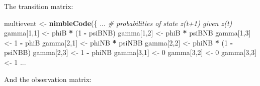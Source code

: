 \documentclass[
  12pt,
]{krantz}
\newenvironment{Shaded}{\begin{snugshade}}{\end{snugshade}}
\newcommand{\CommentTok}[1]{\textcolor[rgb]{0.56,0.35,0.01}{\textit{#1}}}
\newcommand{\DecValTok}[1]{\textcolor[rgb]{0.00,0.00,0.81}{#1}}
\newcommand{\FunctionTok}[1]{\textcolor[rgb]{0.13,0.29,0.53}{\textbf{#1}}}
\newcommand{\NormalTok}[1]{#1}
\newcommand{\OtherTok}[1]{\textcolor[rgb]{0.56,0.35,0.01}{#1}}
\newcommand{\SpecialCharTok}[1]{\textcolor[rgb]{0.81,0.36,0.00}{\textbf{#1}}}
\begin{document}
The transition matrix:

\begin{Shaded}
\begin{Highlighting}[]
\NormalTok{multievent }\OtherTok{\textless{}{-}} \FunctionTok{nimbleCode}\NormalTok{(\{}
\NormalTok{...}
  \CommentTok{\# probabilities of state z(t+1) given z(t)}
\NormalTok{  gamma[}\DecValTok{1}\NormalTok{,}\DecValTok{1}\NormalTok{] }\OtherTok{\textless{}{-}}\NormalTok{ phiB }\SpecialCharTok{*}\NormalTok{ (}\DecValTok{1} \SpecialCharTok{{-}}\NormalTok{ psiBNB)}
\NormalTok{  gamma[}\DecValTok{1}\NormalTok{,}\DecValTok{2}\NormalTok{] }\OtherTok{\textless{}{-}}\NormalTok{ phiB }\SpecialCharTok{*}\NormalTok{ psiBNB}
\NormalTok{  gamma[}\DecValTok{1}\NormalTok{,}\DecValTok{3}\NormalTok{] }\OtherTok{\textless{}{-}} \DecValTok{1} \SpecialCharTok{{-}}\NormalTok{ phiB}
\NormalTok{  gamma[}\DecValTok{2}\NormalTok{,}\DecValTok{1}\NormalTok{] }\OtherTok{\textless{}{-}}\NormalTok{ phiNB }\SpecialCharTok{*}\NormalTok{ psiNBB}
\NormalTok{  gamma[}\DecValTok{2}\NormalTok{,}\DecValTok{2}\NormalTok{] }\OtherTok{\textless{}{-}}\NormalTok{ phiNB }\SpecialCharTok{*}\NormalTok{ (}\DecValTok{1} \SpecialCharTok{{-}}\NormalTok{ psiNBB)}
\NormalTok{  gamma[}\DecValTok{2}\NormalTok{,}\DecValTok{3}\NormalTok{] }\OtherTok{\textless{}{-}} \DecValTok{1} \SpecialCharTok{{-}}\NormalTok{ phiNB}
\NormalTok{  gamma[}\DecValTok{3}\NormalTok{,}\DecValTok{1}\NormalTok{] }\OtherTok{\textless{}{-}} \DecValTok{0}
\NormalTok{  gamma[}\DecValTok{3}\NormalTok{,}\DecValTok{2}\NormalTok{] }\OtherTok{\textless{}{-}} \DecValTok{0}
\NormalTok{  gamma[}\DecValTok{3}\NormalTok{,}\DecValTok{3}\NormalTok{] }\OtherTok{\textless{}{-}} \DecValTok{1}
\NormalTok{...}
\end{Highlighting}
\end{Shaded}

And the observation matrix:
\end{document}
